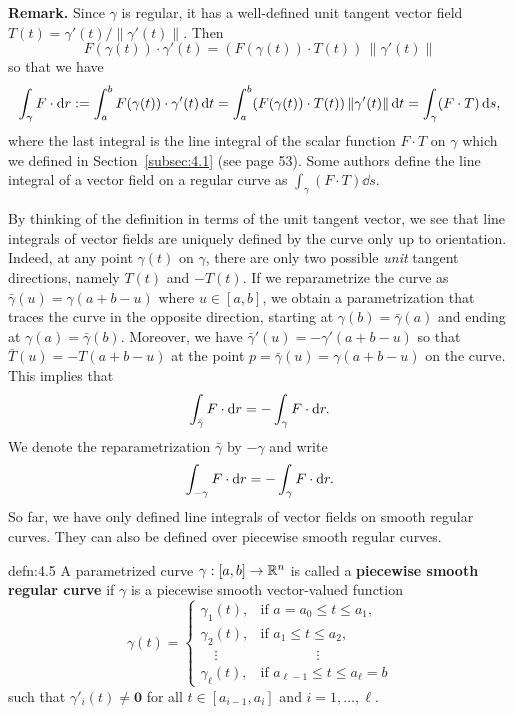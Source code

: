 {\bf Remark.} Since $\gamma$ is regular, it has a well-defined unit tangent 
vector field $T(t) = \gamma'(t)/\|\gamma'(t)\|$. Then 
\[ F(\gamma(t)) \cdot \gamma'(t) = (F(\gamma(t)) \cdot T(t))\,\|\gamma'(t)\| \] 
so that we have 
\[ \int_\gamma F\cdot{\rm d}r := \int_a^b F(\gamma(t)) \cdot \gamma'(t)\,\mathrm{d} t 
= \int_a^b (F(\gamma(t)) \cdot T(t))\,\|\gamma'(t)\|\,\mathrm{d} t = 
\int_\gamma (F \cdot T)\,\mathrm{d} s, \] 
where the last integral is the line integral of the scalar function 
$F \cdot T$ on $\gamma$ which we defined in Section~\ref{subsec:4.1}
(see page 53). Some authors define the line integral of a vector field 
on a regular curve as $\int_\gamma (F \cdot T)\dd s$. 

By thinking of the definition in terms of the unit tangent vector, we see that 
line integrals of vector fields are uniquely defined by the curve only 
up to orientation. Indeed, at any point $\gamma(t)$ on $\gamma$, there are only 
two possible \emph{unit} tangent directions, namely $T(t)$ and $-T(t)$. 
If we reparametrize the curve as $\bar\gamma(u) = \gamma(a+b-u)$ where 
$u \in [a, b]$, we obtain a parametrization that traces the curve in the 
opposite direction, starting at $\gamma(b) = \bar\gamma(a)$ and ending 
at $\gamma(a) = \bar\gamma(b)$. Moreover, we have $\bar\gamma'(u) = 
-\gamma'(a+b-u)$ so that $\bar T(u) = -T(a+b-u)$ at the point 
$p = \bar\gamma(u) = \gamma(a+b-u)$ on the curve. This implies that 
\[ \int_{\bar\gamma} F\cdot{\rm d}r = -\int_\gamma F\cdot{\rm d}r. \] 
We denote the reparametrization $\bar\gamma$ by $-\gamma$ and write 
\[ \int_{-\gamma} F\cdot{\rm d}r = -\int_\gamma F\cdot{\rm d}r. \] 
So far, we have only defined line integrals of vector fields on smooth 
regular curves. They can also be defined over piecewise smooth regular curves. 

\begin{defn}{defn:4.5}
    A parametrized curve $\gamma : [a, b] \to \mathbb{R}^n$ is called a {\bf 
    piecewise smooth regular curve} if $\gamma$ is a piecewise smooth 
    vector-valued function 
    \[ \gamma(t) = \begin{cases}
        \gamma_1(t), & \text{if } a = a_0 \leq t \leq a_1, \\ 
        \gamma_2(t), & \text{if } a_1 \leq t \leq a_2, \\ 
        \quad\vdots & \qquad\qquad \vdots \\ 
        \gamma_\ell(t), & \text{if } a_{\ell-1} \leq t \leq a_\ell = b 
    \end{cases} \] 
    such that $\gamma'_i(t) \neq \mathbf 0$ for all $t \in [a_{i-1}, a_i]$ 
    and $i = 1, \dots, \ell$. 
\end{defn}\vspace{-0.25cm}

